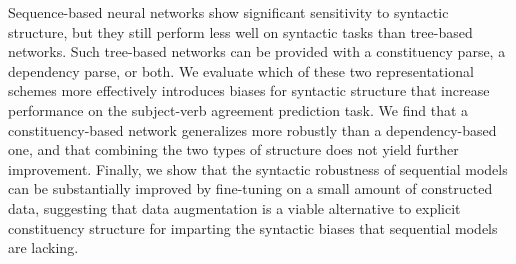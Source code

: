 Sequence-based neural networks show significant sensitivity to syntactic structure, but they still perform less well on syntactic tasks than tree-based networks. Such tree-based networks can be provided with a constituency parse, a dependency parse, or both. We evaluate which of these two representational schemes more effectively introduces biases for syntactic structure that increase performance on the subject-verb agreement prediction task. We find that a constituency-based network generalizes more robustly than a dependency-based one, and that combining the two types of structure does not yield further improvement. Finally, we show that the syntactic robustness of sequential models can be substantially improved by fine-tuning on a small amount of constructed data, suggesting that data augmentation is a viable alternative to explicit constituency structure for imparting the syntactic biases that sequential models are lacking.
